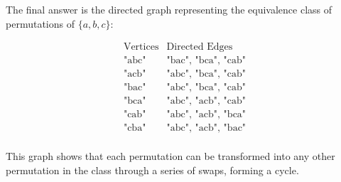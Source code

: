 The final answer is the directed graph representing the equivalence class of permutations of \(\{a, b, c\}\):

\[
\boxed{
\begin{array}{ccc}
\text{Vertices} & \text{Directed Edges} \\
\hline
\text{"abc"} & \text{"bac", "bca", "cab"} \\
\text{"acb"} & \text{"abc", "bca", "cab"} \\
\text{"bac"} & \text{"abc", "bca", "cab"} \\
\text{"bca"} & \text{"abc", "acb", "cab"} \\
\text{"cab"} & \text{"abc", "acb", "bca"} \\
\text{"cba"} & \text{"abc", "acb", "bac"} \\
\end{array}
}
\]

This graph shows that each permutation can be transformed into any other permutation in the class through a series of swaps, forming a cycle.